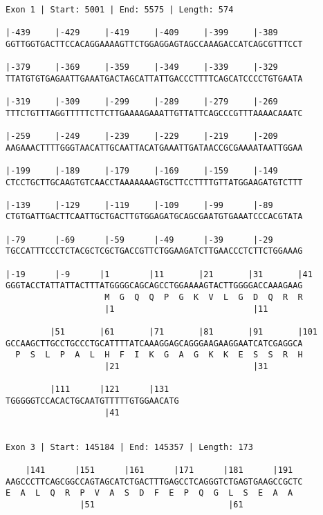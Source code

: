 \documentclass{article}
\begin{document}
 \begin{Verbatim}
 
Exon 1 | Start: 5001 | End: 5575 | Length: 574
 
|-439     |-429     |-419     |-409     |-399     |-389     
GGTTGGTGACTTCCACAGGAAAAGTTCTGGAGGAGTAGCCAAAGACCATCAGCGTTTCCT
                                                            
|-379     |-369     |-359     |-349     |-339     |-329     
TTATGTGTGAGAATTGAAATGACTAGCATTATTGACCCTTTTCAGCATCCCCTGTGAATA
                                                            
|-319     |-309     |-299     |-289     |-279     |-269     
TTTCTGTTTAGGTTTTTCTTCTTGAAAAGAAATTGTTATTCAGCCCGTTTAAAACAAATC
                                                            
|-259     |-249     |-239     |-229     |-219     |-209     
AAGAAACTTTTGGGTAACATTGCAATTACATGAAATTGATAACCGCGAAAATAATTGGAA
                                                            
|-199     |-189     |-179     |-169     |-159     |-149     
CTCCTGCTTGCAAGTGTCAACCTAAAAAAAGTGCTTCCTTTTGTTATGGAAGATGTCTTT
                                                            
|-139     |-129     |-119     |-109     |-99      |-89      
CTGTGATTGACTTCAATTGCTGACTTGTGGAGATGCAGCGAATGTGAAATCCCACGTATA
                                                            
|-79      |-69      |-59      |-49      |-39      |-29      
TGCCATTTCCCTCTACGCTCGCTGACCGTTCTGGAAGATCTTGAACCCTCTTCTGGAAAG
                                                            
|-19      |-9      |1        |11       |21       |31       |41
GGGTACCTATTATTACTTTATGGGGCAGCAGCCTGGAAAAGTACTTGGGGACCAAAGAAG
                    M  G  Q  Q  P  G  K  V  L  G  D  Q  R  R
                    |1                            |11       
  
         |51       |61       |71       |81       |91       |101
GCCAAGCTTGCCTGCCCTGCATTTTATCAAAGGAGCAGGGAAGAAGGAATCATCGAGGCA
  P  S  L  P  A  L  H  F  I  K  G  A  G  K  K  E  S  S  R  H
                    |21                           |31       
  
         |111      |121      |131  
TGGGGGTCCACACTGCAATGTTTTTGTGGAACATG
                    |41            
  
 
Exon 3 | Start: 145184 | End: 145357 | Length: 173
 
    |141      |151      |161      |171      |181      |191  
AAGCCCTTCAGCGGCCAGTAGCATCTGACTTTGAGCCTCAGGGTCTGAGTGAAGCCGCTC
E  A  L  Q  R  P  V  A  S  D  F  E  P  Q  G  L  S  E  A  A  
               |51                           |61            
  

\end{Verbatim}
\end{document}
